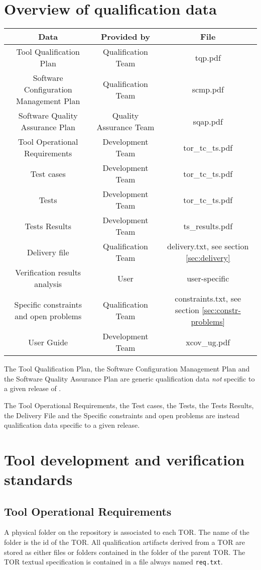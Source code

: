 \documentclass {report}
\begin{document}
\section{Overview of qualification data}
\label{sec:qd-overview}
\begin{tabular}{|c|c|c|}
\hline
\textbf{Data} & \textbf{Provided by} & \textbf{File} \\ \hline
Tool Qualification Plan & Qualification Team & tqp.pdf \\ \hline
Software Configuration Management Plan & Qualification Team & scmp.pdf \\ \hline
Software Quality Assurance Plan & Quality Assurance Team & sqap.pdf \\ \hline
Tool Operational Requirements & Development Team & tor\_tc\_ts.pdf \\ \hline
Test cases & Development Team & tor\_tc\_ts.pdf \\ \hline
Tests & Development Team & tor\_tc\_ts.pdf \\ \hline
Tests Results & Development Team & ts\_results.pdf \\ \hline
Delivery file & Qualification Team & delivery.txt, see section \ref{sec:delivery} \\ \hline
Verification results analysis & User & user-specific \\ \hline
Specific constraints and open problems & Qualification Team & constraints.txt, see section \ref{sec:constr-problems} \\ \hline
\xcov{} User Guide & Development Team & xcov\_ug.pdf \\ \hline
\end{tabular}

The Tool Qualification Plan, the Software Configuration Management Plan and the Software Quality Assurance Plan are generic qualification data \emph{not} specific to a given release of \xcov{}.

The Tool Operational Requirements, the Test cases, the Tests, the Tests Results, the Delivery File and the Specific constraints and open problems are instead qualification data specific to a given \xcov{} release. 

\section{Tool development and verification standards}
\subsection{Tool Operational Requirements}
A physical folder on the repository is associated to each TOR. The name of the folder is the id of the TOR. All qualification artifacts derived from a TOR are stored as either files or folders contained in the folder of the parent TOR. The TOR textual specification is contained in a file always named \texttt{req.txt}.
\end{document}
